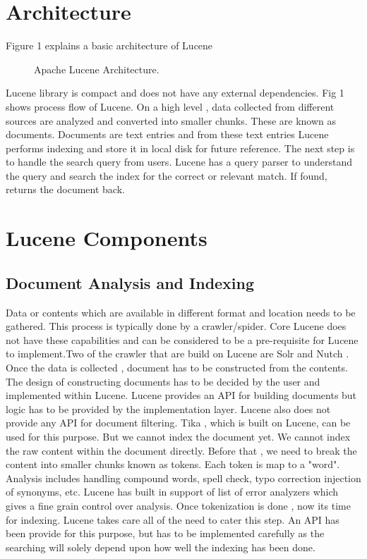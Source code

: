 \documentclass[9pt,twocolumn,twoside]{../../styles/osajnl}
\begin{document}
\section{Architecture}
Figure 1 explains a basic architecture of Lucene

\begin{figure}[htbp]
\centering
{}
\caption{Apache Lucene Architecture.}
\label{fig:lucene-data-flow}
\end{figure}

Lucene library is compact and does not have any external dependencies. 
Fig 1 \cite{lucene-book} shows process flow of Lucene. On a high level , data 
collected from different sources are analyzed and converted into smaller 
chunks. These are known as documents. Documents are text entries and from these 
text entries Lucene performs indexing and store it in local disk for future 
reference. The next step is to handle the search query from users. Lucene has 
a query parser to understand the query and search the index for the correct or 
relevant match. If found, returns the document back.

\section{Lucene Components}

\subsection{Document Analysis and Indexing}
Data or contents which are available in different format and location needs to be gathered. This process is typically done by a crawler/spider. Core Lucene does not have these capabilities and can be considered to be a pre-requisite for Lucene to implement.Two of the crawler that are build on Lucene are Solr \cite{www-solr} and Nutch \cite{www-nutch}. Once the data is collected , document has to be constructed from the contents. The design of constructing documents has to be decided by the user and implemented within Lucene. Lucene provides an API for building documents but logic has to be provided by the implementation layer. Lucene also does not provide any API for document filtering. Tika , which is built on Lucene, can be used for this purpose. But we cannot index the document yet. We cannot index the raw content within the document directly. Before that , we need to break the content into smaller chunks known as tokens. Each token is map to a "word". Analysis includes handling compound words, spell check, typo correction injection of synonyms, etc. Lucene has built in support of list of error analyzers which gives a fine grain control over analysis. Once tokenization is done , now its time for indexing. Lucene takes care all of the need to cater this step. An API has been provide for this purpose, but has to be implemented carefully as the searching will solely depend upon how well the indexing has been done.
\end{document}
